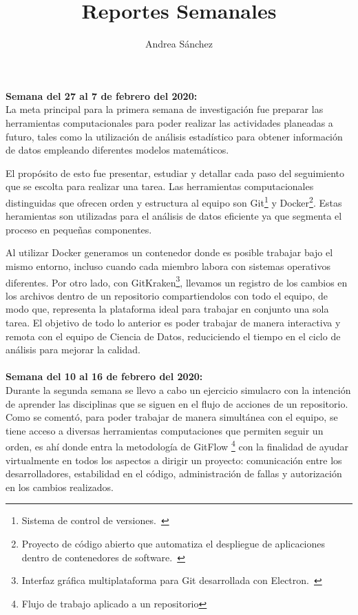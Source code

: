 \documentclass{article}
\title{Reportes Semanales}
\author{Andrea Sánchez}
\begin{document}
\maketitle
    \textbf{Semana del 27 al 7 de febrero del 2020:} \\
    La meta principal para la primera semana de investigación fue preparar las herramientas computacionales para poder realizar las actividades planeadas a futuro, tales como la utilización de análisis estadístico para obtener información de datos empleando diferentes modelos matemáticos.

    El propósito de esto fue presentar, estudiar y detallar cada paso del seguimiento que se escolta para realizar una tarea. Las herramientas computacionales distinguidas que ofrecen orden y estructura al equipo son Git\footnote{Sistema de control de versiones.~\cite{bergh2019}} y Docker\footnote{Proyecto de código abierto que automatiza el despliegue de aplicaciones dentro de contenedores de software.~\cite{bergh2019}}.
        Estas heramientas son utilizadas para el análisis de datos eficiente ya que segmenta el proceso en pequeñas componentes.

    Al utilizar Docker generamos un contenedor donde es posible trabajar bajo el mismo entorno, incluso cuando cada miembro labora con sistemas operativos diferentes. Por otro lado, con GitKraken\footnote{Interfaz gráfica multiplataforma para Git desarrollada con Electron.~\cite{bergh2019}}, llevamos un registro de los cambios en los archivos dentro de un repositorio compartiendolos con todo el equipo, de modo que, representa la plataforma ideal para trabajar en conjunto una sola tarea.
    El objetivo de todo lo anterior es poder trabajar de manera interactiva y remota con el equipo de Ciencia de Datos, reduciciendo el tiempo en el ciclo de análisis para mejorar la calidad.
\\ \\ 
    \textbf{Semana del 10 al 16 de febrero del 2020:} \\
    Durante la segunda semana se llevo a cabo un ejercicio simulacro con la intención de aprender las disciplinas que se siguen en el flujo de acciones de un repositorio. Como se comentó, para poder trabajar de manera simultánea con el equipo, se tiene acceso a diversas herramientas computaciones que permiten seguir un orden, es ahí donde entra la metodología de GitFlow \footnote{Flujo de trabajo aplicado a un repositorio} con la finalidad de ayudar virtualmente en todos los aspectos a dirigir un proyecto: comunicación entre los desarrolladores, estabilidad en el código, administración de fallas y autorización en los cambios realizados.
\end{document}
